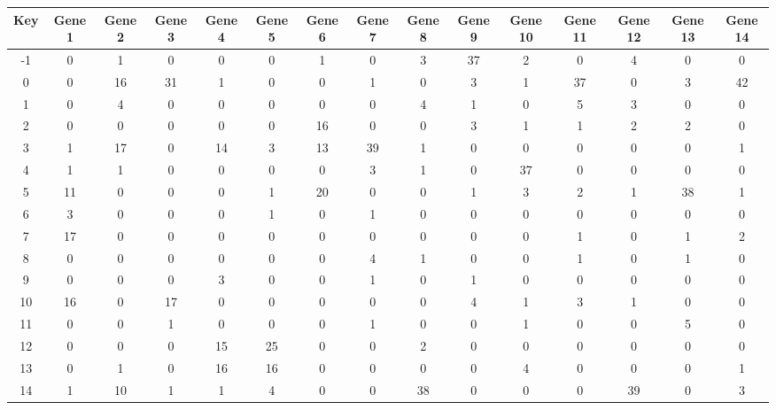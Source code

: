 \begin{tabular}{|c|c|c|c|c|c|c|c|c|c|c|c|c|c|c|}
\hline
Key & Gene 1 & Gene 2 & Gene 3 & Gene 4 & Gene 5 & Gene 6 & Gene 7 & Gene 8 & Gene 9 & Gene 10 & Gene 11 & Gene 12 & Gene 13 & Gene 14 \\
\hline
-1 & 0 & 1 & 0 & 0 & 0 & 1 & 0 & 3 & 37 & 2 & 0 & 4 & 0 & 0 \\
0 & 0 & 16 & 31 & 1 & 0 & 0 & 1 & 0 & 3 & 1 & 37 & 0 & 3 & 42 \\
1 & 0 & 4 & 0 & 0 & 0 & 0 & 0 & 4 & 1 & 0 & 5 & 3 & 0 & 0 \\
2 & 0 & 0 & 0 & 0 & 0 & 16 & 0 & 0 & 3 & 1 & 1 & 2 & 2 & 0 \\
3 & 1 & 17 & 0 & 14 & 3 & 13 & 39 & 1 & 0 & 0 & 0 & 0 & 0 & 1 \\
4 & 1 & 1 & 0 & 0 & 0 & 0 & 3 & 1 & 0 & 37 & 0 & 0 & 0 & 0 \\
5 & 11 & 0 & 0 & 0 & 1 & 20 & 0 & 0 & 1 & 3 & 2 & 1 & 38 & 1 \\
6 & 3 & 0 & 0 & 0 & 1 & 0 & 1 & 0 & 0 & 0 & 0 & 0 & 0 & 0 \\
7 & 17 & 0 & 0 & 0 & 0 & 0 & 0 & 0 & 0 & 0 & 1 & 0 & 1 & 2 \\
8 & 0 & 0 & 0 & 0 & 0 & 0 & 4 & 1 & 0 & 0 & 1 & 0 & 1 & 0 \\
9 & 0 & 0 & 0 & 3 & 0 & 0 & 1 & 0 & 1 & 0 & 0 & 0 & 0 & 0 \\
10 & 16 & 0 & 17 & 0 & 0 & 0 & 0 & 0 & 4 & 1 & 3 & 1 & 0 & 0 \\
11 & 0 & 0 & 1 & 0 & 0 & 0 & 1 & 0 & 0 & 1 & 0 & 0 & 5 & 0 \\
12 & 0 & 0 & 0 & 15 & 25 & 0 & 0 & 2 & 0 & 0 & 0 & 0 & 0 & 0 \\
13 & 0 & 1 & 0 & 16 & 16 & 0 & 0 & 0 & 0 & 4 & 0 & 0 & 0 & 1 \\
14 & 1 & 10 & 1 & 1 & 4 & 0 & 0 & 38 & 0 & 0 & 0 & 39 & 0 & 3 \\
\hline
\end{tabular}
